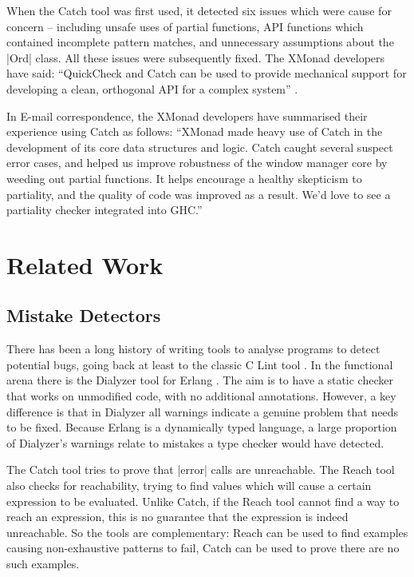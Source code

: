 When the Catch tool was first used, it detected six issues which were cause for concern -- including unsafe uses of partial functions, API functions which contained incomplete pattern matches, and unnecessary assumptions about the |Ord| class. All these issues were subsequently fixed. The XMonad developers have said: ``QuickCheck and Catch can be used to provide mechanical support for developing a clean, orthogonal API for a complex system'' \cite{xmonad}.

In E-mail correspondence, the XMonad developers have summarised their experience using Catch as follows: ``XMonad made heavy use of Catch in the development of its core data structures and logic. Catch caught several suspect error cases, and helped us improve robustness of the window manager core by weeding out partial functions. It helps encourage a healthy skepticism to partiality, and the quality of code was improved as a result. We'd love to see a partiality checker integrated into GHC.''

\section{Related Work}
\label{secC:catch_related}

\subsection{Mistake Detectors}

There has been a long history of writing tools to analyse programs to detect potential bugs, going back at least to the classic C Lint tool \cite{lint}. In the functional arena there is the Dialyzer tool \cite{dialyzer} for Erlang \cite{erlang}. The aim is to have a static checker that works on unmodified code, with no additional annotations. However, a key difference is that in Dialyzer all warnings indicate a genuine problem that needs to be fixed. Because Erlang is a dynamically typed language, a large proportion of Dialyzer's warnings relate to mistakes a type checker would have detected.

The Catch tool tries to prove that |error| calls are unreachable. The Reach tool \cite{naylor:reach} also checks for reachability, trying to find values which will cause a certain expression to be evaluated. Unlike Catch, if the Reach tool cannot find a way to reach an expression, this is no guarantee that the expression is indeed unreachable. So the tools are complementary: Reach can be used to find examples causing non-exhaustive patterns to fail, Catch can be used to prove there are no such examples.


